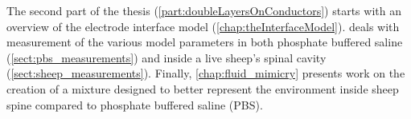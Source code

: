   The second part of the thesis (\cref{part:doubleLayersOnConductors}) starts with an overview of the electrode interface model (\cref{chap:theInterfaceModel}).
   deals with measurement of the various model parameters in both phosphate buffered saline (\cref{sect:pbs_measurements}) and inside a live sheep's spinal cavity (\cref{sect:sheep_measurements}).
  Finally, \cref{chap:fluid_mimicry} presents work on the creation of a mixture designed to better represent the environment inside sheep spine compared to phosphate buffered saline (PBS).
